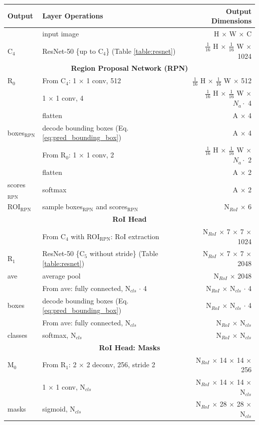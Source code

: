 {
\begin{longtable}{llr}
\toprule
\textbf{Output} & \textbf{Layer Operations} & \textbf{Output Dimensions} \\
\midrule\midrule
& input image & H $\times$ W $\times$ C \\
\midrule
C$_4$ & ResNet-50 \{up to C$_4$\} (Table \ref{table:resnet})  & $\tfrac{1}{16}$ H $\times$ $\tfrac{1}{16}$ W $\times$ 1024 \\
\midrule
\multicolumn{3}{c}{\textbf{Region Proposal Network (RPN)}}\\
\midrule
R$_0$ & From C$_4$: 1 $\times$ 1 conv, 512 & $\tfrac{1}{16}$ H $\times$ $\tfrac{1}{16}$ W $\times$ 512 \\
& 1 $\times$ 1 conv, 4 & $\tfrac{1}{16}$ H $\times$ $\tfrac{1}{16}$ W $\times$ $N_a \cdot$ 4 \\
& flatten & A $\times$ 4 \\
boxes$_{\mathrm{RPN}}$ & decode bounding boxes (Eq. \ref{eq:pred_bounding_box}) & A $\times$ 4\\
& From R$_0$: 1 $\times$ 1 conv, 2 & $\tfrac{1}{16}$ H $\times$ $\tfrac{1}{16}$ W $\times$ $N_a \cdot$ 2 \\
& flatten & A $\times$ 2 \\
scores$_{\mathrm{RPN}}$& softmax & A $\times$ 2 \\
ROI$_{\mathrm{RPN}}$ & sample boxes$_{\mathrm{RPN}}$ and scores$_{\mathrm{RPN}}$ & N$_{RoI}$ $\times$ 6 \\
\midrule
\multicolumn{3}{c}{\textbf{RoI Head}}\\
\midrule
& From C$_4$ with ROI$_{\mathrm{RPN}}$: RoI extraction & N$_{RoI}$ $\times$ 7 $\times$ 7 $\times$ 1024 \\
R$_1$& ResNet-50 \{C$_5$ without stride\} (Table \ref{table:resnet})  & N$_{RoI}$ $\times$ 7 $\times$ 7 $\times$ 2048 \\
ave & average pool & N$_{RoI}$ $\times$ 2048 \\
& From ave: fully connected, N$_{cls}$ $\cdot$ 4 & N$_{RoI}$ $\times$ N$_{cls}$ $\cdot$ 4\\
boxes & decode bounding boxes (Eq. \ref{eq:pred_bounding_box}) & N$_{RoI}$ $\times$ N$_{cls}$ $\cdot$ 4\\
& From ave: fully connected, N$_{cls}$ & N$_{RoI}$ $\times$ N$_{cls}$ \\
classes& softmax, N$_{cls}$ & N$_{RoI}$ $\times$ N$_{cls}$ \\
\midrule
\multicolumn{3}{c}{\textbf{RoI Head: Masks}}\\
\midrule
M$_0$ & From R$_1$: 2 $\times$ 2 deconv, 256, stride 2 & N$_{RoI}$ $\times$ 14 $\times$ 14 $\times$ 256 \\
& 1 $\times$ 1 conv, N$_{cls}$ & N$_{RoI}$ $\times$ 14 $\times$ 14 $\times$ N$_{cls}$ \\
masks & sigmoid, N$_{cls}$ & N$_{RoI}$ $\times$ 28 $\times$ 28 $\times$ N$_{cls}$ \\


\end{longtable}}
